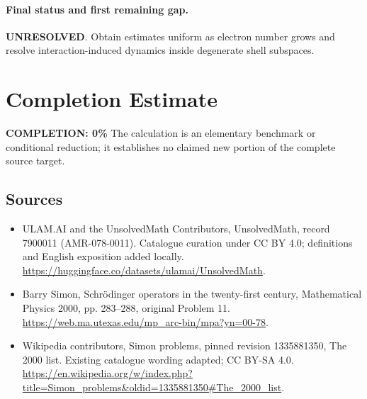 \documentclass[11pt]{article}
\begin{document}
\paragraph{Final status and first remaining gap.}
\textbf{UNRESOLVED}. Obtain estimates uniform as electron number grows and resolve interaction-induced dynamics inside degenerate shell subspaces.

\section{Completion Estimate}
\noindent\textbf{COMPLETION: 0\%}
The calculation is an elementary benchmark or conditional reduction; it establishes no claimed new portion of the complete source target.

\subsection{Sources}
\begin{itemize}
\item[\hypertarget{source:7900011:1}{S1}] ULAM.AI and the UnsolvedMath Contributors, UnsolvedMath, record 7900011 (AMR-078-0011). Catalogue curation under CC BY 4.0; definitions and English exposition added locally.
\url{https://huggingface.co/datasets/ulamai/UnsolvedMath}.
\item[\hypertarget{source:7900011:2}{S2}] Barry Simon, Schrödinger operators in the twenty-first century, Mathematical Physics 2000, pp. 283–288, original Problem 11.
\url{https://web.ma.utexas.edu/mp_arc-bin/mpa?yn=00-78}.
\item[\hypertarget{source:7900011:3}{S3}] Wikipedia contributors, Simon problems, pinned revision 1335881350, The 2000 list. Existing catalogue wording adapted; CC BY-SA 4.0.
\url{https://en.wikipedia.org/w/index.php?title=Simon_problems&oldid=1335881350#The_2000_list}.
\end{itemize}
\label{end:7900011}
\end{document}
